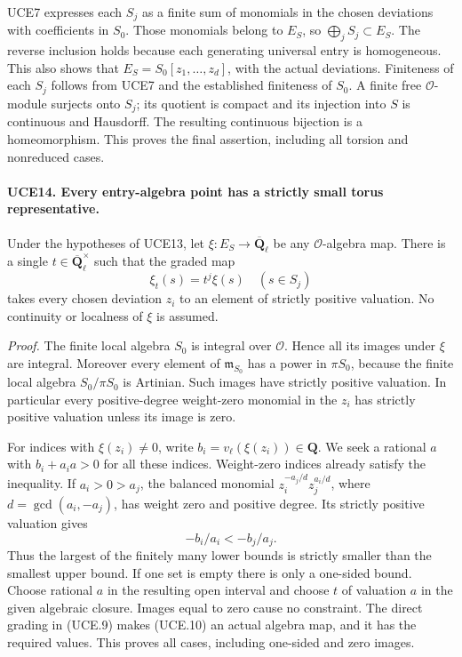 \documentclass[11pt,a4paper]{article}
\numberwithin{equation}{section}
\theoremstyle{remark}\newtheorem{remark}[theorem]{Remark}
\begin{document}
UCE7 expresses each \(S_j\) as a finite sum of monomials in the
chosen deviations with coefficients in \(S_0\).  Those monomials
belong to \(E_S\), so \(\bigoplus_jS_j\subset E_S\).
The reverse inclusion holds because each generating universal
entry is homogeneous.  This also shows that
\(E_S=S_0[z_1,\ldots,z_d]\), with the actual deviations.
Finiteness of each \(S_j\) follows from UCE7 and the established
finiteness of \(S_0\).  A finite free \(\mathcal O\)-module
surjects onto \(S_j\); its quotient is compact and its injection
into \(S\) is continuous and Hausdorff.  The resulting continuous
bijection is a homeomorphism.  This proves the final assertion,
including all torsion and nonreduced cases.

\paragraph{UCE14. Every entry-algebra point has a strictly small torus representative.}
\label{claim:UCE14}
Under the hypotheses of UCE13, let
\(\xi:E_S\to\overline{\mathbf Q}_\ell\) be any
\(\mathcal O\)-algebra map.  There is a single
\(t\in\overline{\mathbf Q}_\ell^\times\) such that the graded
map
\[
                  \xi_t(s)=t^j\xi(s)\quad(s\in S_j)
 \tag{UCE.10}
\]
takes every chosen deviation \(z_i\) to an element of strictly
positive valuation.  No continuity or localness of \(\xi\)
is assumed.

\emph{Proof.}
The finite local algebra \(S_0\) is integral over \(\mathcal O\).
Hence all its images under \(\xi\) are integral.  Moreover every
element of \(\mathfrak m_{S_0}\) has a power in \(\pi S_0\),
because the finite local algebra \(S_0/\pi S_0\) is Artinian.
Such images have strictly positive valuation.  In particular every
positive-degree weight-zero monomial in the \(z_i\) has strictly
positive valuation unless its image is zero.

For indices with \(\xi(z_i)\ne0\), write
\(b_i=v_\ell(\xi(z_i))\in\mathbf Q\).  We seek a rational
\(a\) with \(b_i+a_i a>0\) for all these indices.  Weight-zero
indices already satisfy the inequality.  If \(a_i>0>a_j\), the
balanced monomial
\(z_i^{-a_j/d}z_j^{a_i/d}\), where \(d=\gcd(a_i,-a_j)\),
has weight zero and positive degree.  Its strictly positive
valuation gives
\[
                       -b_i/a_i<-b_j/a_j.
 \tag{UCE.11}
\]
Thus the largest of the finitely many lower bounds is strictly
smaller than the smallest upper bound.  If one set is empty there
is only a one-sided bound.  Choose rational \(a\) in the resulting
open interval and choose \(t\) of valuation \(a\) in the given
algebraic closure.  Images equal to zero cause no constraint.
The direct grading in (UCE.9) makes (UCE.10) an actual algebra
map, and it has the required values.  This proves all cases,
including one-sided and zero images.
\end{document}
